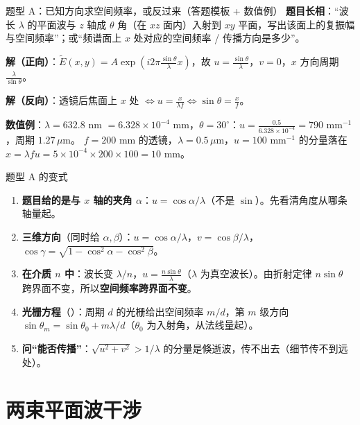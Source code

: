 \begin{exam}{题型 A：已知方向求空间频率，或反过来（答题模板 + 数值例）}
\textbf{题目长相}：“波长 $\lambda$ 的平面波与 $z$ 轴成 $\theta$ 角（在 $xz$ 面内）入射到 $xy$ 平面，写出该面上的复振幅与空间频率”；或“频谱面上 $x$ 处对应的空间频率 / 传播方向是多少”。

\textbf{解（正向）}：$\tilde E(x,y)=A\exp\left(i2\pi\frac{\sin\theta}{\lambda}x\right)$，故 $u=\frac{\sin\theta}{\lambda}$，$v=0$，$x$ 方向周期 $\frac{\lambda}{\sin\theta}$。

\textbf{解（反向）}：透镜后焦面上 $x$ 处 $\Leftrightarrow u=\frac{x}{\lambda f}\Leftrightarrow\sin\theta=\frac xf$。

\textbf{数值例}：$\lambda=632.8$ nm $=6.328\times10^{-4}$ mm，$\theta=30^\circ$：$u=\frac{0.5}{6.328\times10^{-4}}=790$ mm$^{-1}$，周期 $1.27\,\mu$m。
$f=200$ mm 的透镜，$\lambda=0.5\,\mu$m，$u=100$ mm$^{-1}$ 的分量落在 $x=\lambda fu=5\times10^{-4}\times200\times100=10$ mm。
\end{exam}

\begin{recipe}{题型 A 的变式}
\begin{enumerate}
\item \textbf{题目给的是与 $x$ 轴的夹角 $\alpha$}：$u=\cos\alpha/\lambda$（不是 $\sin$）。先看清角度从哪条轴量起。
\item \textbf{三维方向}（同时给 $\alpha,\beta$）：$u=\cos\alpha/\lambda$，$v=\cos\beta/\lambda$，$\cos\gamma=\sqrt{1-\cos^2\alpha-\cos^2\beta}$。
\item \textbf{在介质 $n$ 中}：波长变 $\lambda/n$，$u=\frac{n\sin\theta}{\lambda}$（$\lambda$ 为真空波长）。由折射定律 $n\sin\theta$ 跨界面不变，所以\textbf{空间频率跨界面不变}。
\item \textbf{光栅方程}（\pageref{fml:grating}）：周期 $d$ 的光栅给出空间频率 $m/d$，第 $m$ 级方向 $\sin\theta_m=\sin\theta_0+m\lambda/d$（$\theta_0$ 为入射角，从法线量起）。
\item \textbf{问“能否传播”}：$\sqrt{u^2+v^2}>1/\lambda$ 的分量是倏逝波，传不出去（细节传不到远处）。
\end{enumerate}
\end{recipe}

\section{两束平面波干涉}\label{sec:twobeam}

